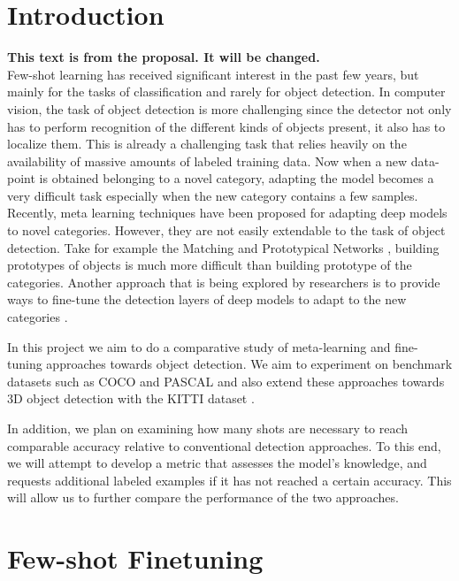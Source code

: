 \documentclass{article}
\begin{document}
\section{Introduction}
{\color{magenta}
\textbf{This text is from the proposal. It will be changed.} \\
Few-shot learning has received significant interest in the past few years, 
but mainly for the tasks of classification and rarely for object detection. 
In computer vision, the task of object detection is more challenging since the detector 
not only has to perform recognition of the different kinds of objects present,
it also has to localize them. This is already a challenging task that relies heavily 
on the availability of massive amounts of labeled training data. Now when a new data-point 
is obtained belonging to a novel category, adapting the model becomes a very difficult 
task especially when the new category contains a few samples. Recently, meta learning techniques 
have been proposed for adapting deep models to novel categories. However, they are not easily 
extendable to the task of object detection. Take for example the Matching \cite{VinyalsBLKW16} 
and Prototypical Networks \cite{snell2017prototypical}, building prototypes of objects is 
much more difficult than building prototype of the categories. Another approach that is being 
explored by researchers is to provide ways to fine-tune the detection layers of 
deep models to adapt to the new categories \cite{wang2020frustratingly}.


In this project we aim to do a comparative study of meta-learning and fine-tuning approaches 
towards object detection. We aim to experiment on benchmark datasets such as 
COCO \cite{LinMBHPRDZ14} and PASCAL \cite{Everingham10} and also extend these approaches 
towards 3D object detection with the KITTI dataset \cite{Geiger2013IJRR}.

In addition, we plan on examining how many shots are necessary to reach comparable accuracy relative to 
conventional detection approaches. To this end, we will attempt to develop a metric that assesses
the model's knowledge, and requests additional labeled examples if it has not reached a certain accuracy. 
This will allow us to further compare the performance of the two approaches. 
} 

\section{Few-shot Finetuning}
\end{document}
